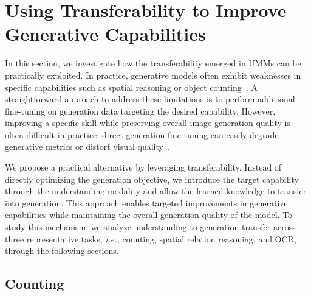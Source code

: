 
\section{\textbf{Using Transferability to Improve Generative Capabilities}
}
\label{sec:tasks}
In this section, we investigate how the transferability emerged in UMMs can be practically exploited. In practice, generative models often exhibit weaknesses in specific capabilities such as spatial reasoning or object counting~\cite{ghosh2023geneval, gokhale2022visor}. A straightforward approach to address these limitations is to perform additional fine-tuning on generation data targeting the desired capability. However, improving a specific skill while preserving overall image generation quality is often difficult in practice: direct generation fine-tuning can easily degrade generative metrics or distort visual quality~\cite{yoon2024modelcollapse,chae2025apt}.

We propose a practical alternative by leveraging transferability. Instead of directly optimizing the generation objective, we introduce the target capability through the understanding modality and allow the learned knowledge to transfer into generation. This approach enables targeted improvements in generative capabilities while maintaining the overall generation quality of the model. To study this mechanism, we analyze understanding-to-generation transfer across three representative tasks, \textit{i.e.,} counting, spatial relation reasoning, and OCR, through the following sections.



\subsection{Counting}
% 



